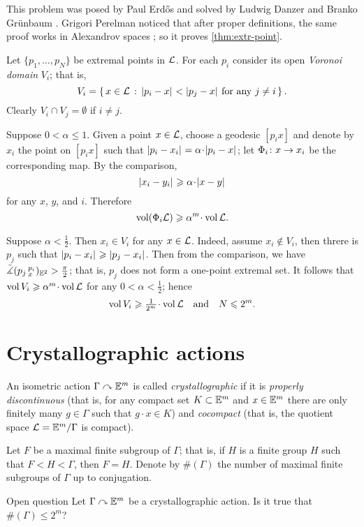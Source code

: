 This problem was posed by Paul Erd\H{o}s  \cite{erdos} and solved by Ludwig Danzer and Branko Gr\"unbaum \cite{danzer-gruenbaum}.
Grigori Perelman noticed that after proper definitions, the same proof works in Alexandrov spaces \cite{perelman-Erdos}; so it proves \ref{thm:extr-point}.

Let $\{p_1,\dots,p_N\}$ be extremal points in $\mathcal{L}$.
For each $p_i$ consider its open \emph{Voronoi domain} $V_i$; that is, 
\[V_i=\set{x\in \spc{L}}{\dist{p_i}{x}{}<\dist{p_j}{x}{}\ \text{for any}\ j\not=i}.\]
Clearly $V_i\cap V_j=\emptyset$ if $i\not=j$.

Suppose  $0<\alpha\le 1$.
Given a point $x\in\mathcal{L}$, choose a geodesic $[p_ix]$ and denote by $x_i$ the point on $[p_ix]$ such that $\dist{p_i}{x_i}{}=\alpha\cdot\dist{p_i}{x}{}$;
let $\Phi_i\colon x\to x_i$ be the corresponding map.
By the comparison, 
\[\dist{x_i}{y_i}{}\ge\alpha\cdot \dist{x}{y}{}\]
for any $x$, $y$, and $i$.
Therefore 
\[\vol(\map_i \spc{L})\ge\alpha^m\cdot\vol \spc{L}.\]

Suppose $\alpha<\tfrac12$.
Then $x_i\in V_i$ for any $x\in \mathcal{L}$.
Indeed, assume $x_i\notin V_i$,
then threre is $p_j$ such that $\dist{p_i}{x_i}{}\ge\dist{p_j}{x_i}{}$.
Then from the comparison, we have $\tilde\measuredangle(p_j\,{}^{p_i}_{x})_{\mathbb{E}^2}>\tfrac\pi2$;
that is, $p_j$ does not form a one-point extremal set.
It follows that $\vol V_i\ge\alpha^m\cdot\vol \spc{L}$
for any $0<\alpha<\tfrac12$; hence 
\[\vol V_i\ge\tfrac1{2^m}\cdot\vol \spc{L}\quad\text{and}\quad N\le 2^m.\]
\qedsf

\section{Crystallographic actions}


An isometric action $\Gamma\curvearrowright \mathbb{E}^m$ is called \emph{crystallographic} if it is 
\emph{properly discontinuous} (that is, for any compact set $K\subset \mathbb{E}^m$ and $x\z\in \EE^m$ there are only finitely many $g\in \Gamma$ such that $g\cdot x\in K$) and \emph{cocompact} (that is, the quotient space $\mathcal{L}=\mathbb{E}^m/\Gamma$ is compact).

Let $F$ be a maximal finite subgroup of $\Gamma$;
that is, if $H$ is a finite group $H$ such that $F<H<\Gamma$, then $F=H$.
Denote by $\#(\Gamma)$ the number of maximal finite subgroups of $\Gamma$ up to conjugation.

\begin{thm}{Open question}
Let $\Gamma\curvearrowright \mathbb{E}^m$ be a crystallographic action.
Is it true that $\#(\Gamma)\le 2^m$?
\end{thm}

